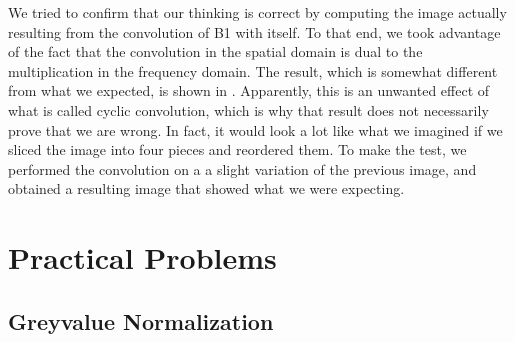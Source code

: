 \documentclass[a4paper,twocolumn]{article}
\begin{document}
	We tried to confirm that our thinking is correct by computing the image actually resulting from the convolution of B1 with itself. To that end, we took advantage of the fact that the convolution in the spatial domain is dual to the multiplication in the frequency domain. The result, which is somewhat different from what we expected, is shown in . Apparently, this is an unwanted effect of what is called cyclic convolution, which is why that result does not necessarily prove that we are wrong. In fact, it would look a lot like what we imagined if we sliced the image into four pieces and reordered them. To make the test, we performed the convolution on a a slight variation of the previous image, and obtained a resulting image that showed what we were expecting.
	
	\section{Practical Problems}
	
	\subsection{Greyvalue Normalization}
	
\end{document}
